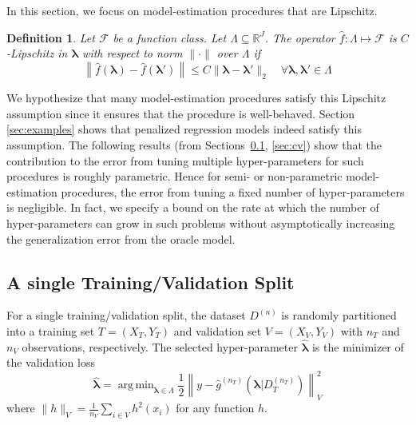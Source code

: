 \documentclass[12pt]{article}
\newtheorem{definition}{Definition}
\DeclareMathOperator*{\argmin}{arg\,min}
\begin{document}
In this section, we focus on model-estimation procedures that are Lipschitz.
\begin{definition}
	\label{def:smooth_funcs}
	Let $\mathcal{F}$ be a function class. Let $\Lambda \subseteq \mathbb{R}^J$.
	The operator $\hat{f}: \Lambda \mapsto \mathcal{F}$ is $C$-Lipschitz in $\boldsymbol{\lambda}$ with respect to norm $\| \cdot \|$ over $\Lambda$ if
	\begin{equation}
	\left \| \hat{f}(\boldsymbol \lambda) - \hat{f}(\boldsymbol \lambda ') \right \|
	\le
	C \| \boldsymbol \lambda - \boldsymbol \lambda' \|_2 
	\quad
	\forall \boldsymbol \lambda,\boldsymbol \lambda' \in \Lambda
	\label{eq:smooth_funcs}
	\end{equation}
\end{definition}
We hypothesize that many model-estimation procedures satisfy this Lipschitz assumption since it ensures that the procedure is well-behaved. Section \ref{sec:examples} shows that penalized regression models indeed satisfy this assumption. The following results (from Sections~\ref{sec:single}, \ref{sec:cv}) show that the contribution to the error from tuning multiple hyper-parameters for such procedures is roughly parametric. Hence for semi- or non-parametric model-estimation procedures, the error from tuning a fixed number of hyper-parameters is negligible. In fact, we specify a bound on the rate at which the number of hyper-parameters can grow in such problems without asymptotically increasing the generalization error from the oracle model.

\subsection{A single Training/Validation Split}\label{sec:single}

For a single training/validation split, the dataset $D^{(n)}$ is randomly partitioned into a training set $T = (X_T, Y_T)$ and validation set $V = (X_V, Y_V)$ with $n_T$ and $n_V$ observations, respectively. The selected hyper-parameter $\hat{\boldsymbol{\lambda}}$ is the minimizer of the validation loss
\begin{equation}
\label{eq:train_val_lambda}
\hat{\boldsymbol \lambda} = \argmin_{\boldsymbol{\lambda} \in\Lambda} \frac{1}{2} \left \| y-\hat{g}^{(n_T)}( \boldsymbol \lambda | D_T^{(n_T)}) \right \|_{V}^{2}
\end{equation}
where $\| h \|_{V}=\frac{1}{n_V}\sum_{i\in V} h^2(x_i)$ for any function $h$. 
\end{document}
